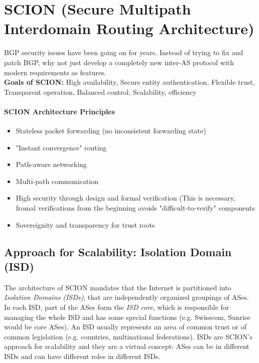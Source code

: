 \section{SCION \small (Secure Multipath Interdomain Routing Architecture)}

BGP security issues have been going on for years. Instead of trying to fix and patch BGP, why not just develop a completely new inter-AS protocol with modern requirements as features.\\

\textbf{Goals of SCION:} High availability, Secure entity authentication, Flexible trust, Transparent operation, Balanced control, Scalability, efficiency

\paragraph{SCION Architecture Principles}
\begin{itemize}
    \item Stateless packet forwarding (no inconsistent forwarding state)
    \item "Instant convergence" routing
    \item Path-aware networking
    \item Multi-path communication
    \item High security through design and formal verification (This is necessary, fromal verifications from the beginning avoids "difficult-to-verify" components
    \item Sovereignity and transparency for trust roots
\end{itemize}

\subsection{Approach for Scalability: Isolation Domain (ISD)}
The architecture of SCION mandates that the Internet is partitioned into \textit{Isolation Domains (ISDs)}, that are independently organized groupings of ASes. In each ISD, part of the ASes form the \textit{ISD core}, which is responsible for managing the whole ISD and has some special functions (e.g. Swisscom, Sunrise would be core ASes). An ISD usually represents an area of common trust or of common legislation (e.g. countries, multinational federations). ISDs are SCION's approach for scalability and they are a virtual concept: ASes can be in different ISDs and can have different roles in different ISDs.

